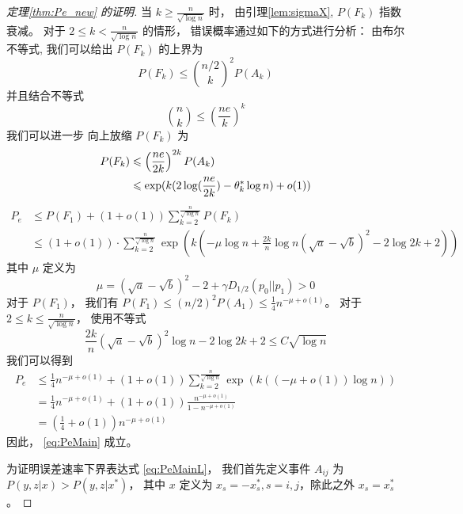 \begin{proof}[定理\ref{thm:Pe_new} 的证明]
当 $k \geq \frac{n}{\sqrt{\log n}}$ 时，
由引理\ref{lem:sigmaX},
$P(F_k)$ 指数衰减。
对于 $2\leq k < \frac{n}{\sqrt{\log n}}$
的情形，
错误概率通过如下的方式进行分析：
由布尔不等式,
我们可以给出 $P(F_k)$ 的上界为
\begin{equation}\label{eq:FAk}
P(F_k) \leq \binom{n/2}{k}^2 P(A_k)
\end{equation}
并且结合不等式
\begin{equation}\label{eq:nk_binom_small}
    \binom{n}{k} \leq (\frac{ne}{k})^k
\end{equation}
我们可以进一步 向上放缩 $P(F_k)$ 为
\begin{align}
P(F_k) & \leq \left(\frac{ne}{2k}\right)^{2k} P(A_k) 
\label{eq:P_F_k_less_A_k}\\
&\leq \exp(k(2\log(\frac{ne}{2k})-\theta_k^* \log n) + o(1))
\notag
\end{align}
\begin{align*}
P_e &\leq P(F_1)+(1+o(1))\sum_{k=2}^{\frac{n}{\sqrt{\log n}}} P(F_k) \\
& \leq (1+o(1))\cdot \sum_{k=2}^{\frac{n}{\sqrt{\log n}}}
\exp\left(k(-\mu \log n + \frac{2k}{n} \log n(\sqrt{a} - \sqrt{b})^2 - 2\log 2k + 2)
\right)
\end{align*}
其中 $\mu$ 定义为
\begin{equation}\label{eq:mu_def}
	\mu = (\sqrt{a} - \sqrt{b})^2-2 + \gamma D_{1/2}(p_0||p_1) > 0	
\end{equation}
对于 $P(F_1)$， 我们有 $P(F_1)\leq (n/2)^2
P(A_1)\leq \frac{1}{4}n^{-\mu+o(1)}$。
对于 $2\leq k \leq \frac{n}{\sqrt{\log n}}$，
使用不等式
$$
\frac{2k}{n}(\sqrt{a} - \sqrt{b})^2\log n -2\log2k+2\leq  C\sqrt{\log n}
$$
我们可以得到
\begin{align*}
P_e &\leq \frac{1}{4}n^{-\mu + o(1)} +(1+o(1)) \sum_{k=2}^{\frac{n}{\sqrt{\log n}}} \exp(k((-\mu + o(1)) \log n )) \\
& =\frac{1}{4}n^{-\mu + o(1)}+(1+o(1)) \frac{n^{-\mu + o(1)}}{1-n^{-\mu + o(1)}} \\
&= (\frac{1}{4}+o(1))n^{-\mu + o(1)}
\end{align*}
因此， \eqref{eq:PeMain} 成立。

为证明误差速率下界表达式
\eqref{eq:PeMainL}，
我们首先定义事件 $A_{ij}$ 为
$P(y,z|x) > P(y,z|x^*)$，
其中 $x$ 定义为
$x_s=-x^*_s,
s=i,j$，除此之外
$x_s=x^*_s$
。


\end{proof}
